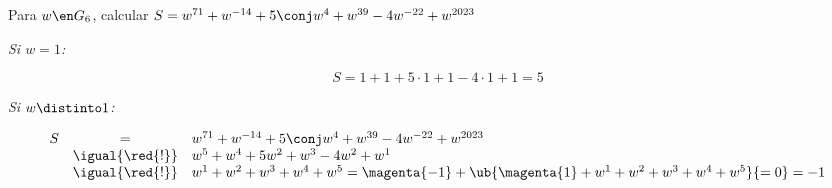 \begin{enunciado}{\ejExtra}
  Para $w \en G_6$, calcular
  $S = w^{71} + w^{-14} + 5\conj w^4 + w^{39} - 4w^{-22} + w^{2023}$
\end{enunciado}

\textit{Si $w = 1$: }\par
$$
  S = 1 + 1+ 5 \cdot 1 + 1 - 4 \cdot 1 + 1 = 5
$$

\textit{Si $w \distinto 1$: }\par
$$
  \begin{array}{rcl}
    S & =               & w^{71} + w^{-14} + 5\conj w^4 + w^{39} - 4w^{-22} + w^{2023}                                         \\
      & \igual{\red{!}} & w^5 + w^4 + 5 w^2 + w^3 - 4w^2 + w^1                                                                 \\
      & \igual{\red{!}} & w^1 + w^2 + w^3 + w^4 + w^5 = \magenta{-1} + \ub{\magenta{1} + w^1 + w^2 + w^3 + w^4 + w^5}{=0} = -1
  \end{array}
$$

\begin{aportes}
  \item {}
  \item {}
\end{aportes}
